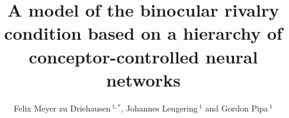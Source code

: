 \documentclass{frontiersSCNS} %
\def\firstAuthorLast{Meyer zu Driehausen {et~al.}} %
\def\Authors{Felix Meyer zu Driehausen\,$^{1,*}$, Johannes Leugering\,$^{1}$ and Gordon Pipa\,$^1$}
\begin{document}
\onecolumn
{}

\title[Binocular Rivalry in Conceptor networks]{A model of the binocular rivalry condition based on a hierarchy of conceptor-controlled neural networks} 

\author[\firstAuthorLast ]{\Authors} %
\address{} %
\correspondance{} %

\extraAuth{}%


\maketitle

\end{document}
